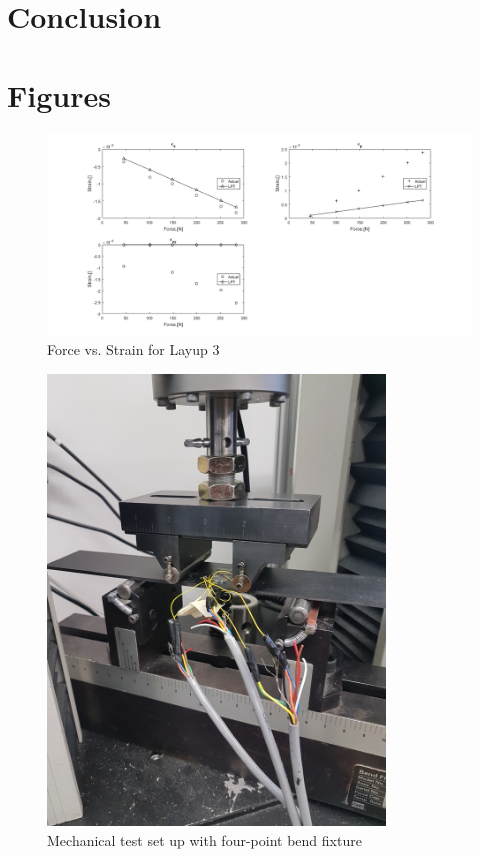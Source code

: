 \documentclass[12pt]{article}
\begin{document}
\section{Conclusion} %

\section{Figures}
\begin{figure}[H]
	\centering
	\includegraphics[width=1\textwidth]{FvsStrain.png}
	\caption{Force vs. Strain for Layup 3}
	\label{fig:FvStrain}
\end{figure}
\begin{figure}[H]
	\centering
	\includegraphics[width=0.8\textwidth, angle =-90 ]{fixture4pt.jpg}
	\caption{Mechanical test set up with four-point bend fixture}
	\label{fig:Fixture}
\end{figure}
\end{document}
